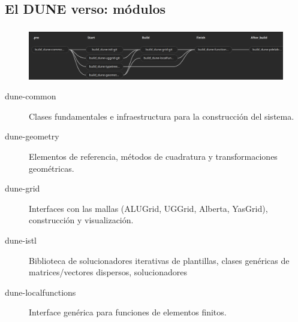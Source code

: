 \subsection{El DUNE verso: módulos}
\begin{frame}
	\frametitle{\secname}
	\framesubtitle{\subsecname}

	\begin{figure}[ht!]
		\centering
		\includegraphics[width=14.5cm]{dependences}
	\end{figure}

	\begin{description}
		\item[dune-common] Clases fundamentales e infraestructura para la construcción del sistema.

		\item[dune-geometry] Elementos de referencia, métodos de cuadratura y transformaciones geométricas.

		\item[dune-grid] Interfaces con las mallas (ALUGrid, UGGrid, Alberta, YasGrid), construcción y visualización.

		\item[dune-istl] Biblioteca de solucionadores iterativas de plantillas, clases genéricas de matrices/vectores dispersos, solucionadores

		\item[dune-localfunctions] Interface genérica para funciones de elementos finitos.


	\end{description}

\end{frame}
